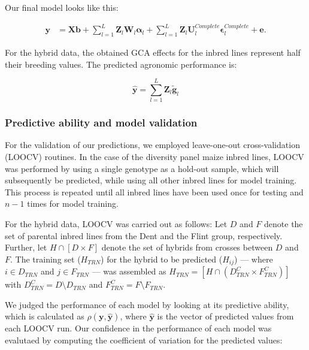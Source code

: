 \documentclass[]{elsarticle} %
\begin{document}
Our final model looks like this:

\begin{align}
 \label{eq:final-model}
\mathbf{y} &= \mathbf{Xb} +
\sum_{l=1}^{L} \mathbf{Z}_{l}\mathbf{W}_{l} \boldsymbol{\alpha}_{l} + 
\sum_{l=1}^{L} \mathbf{Z}_{l}\mathbf{U}_{l}^{Complete} \boldsymbol{\epsilon}_{l}^{Complete} +
\mathbf{e}.
\end{align}

For the hybrid data, the obtained GCA effects for the inbred lines
represent half their breeding values. The predicted agronomic
performance is:

\begin{equation}
 \label{eq:predicted-performance}
\hat{\mathbf{y}} = \sum_{l=1}^{L} \mathbf{Z}_{l}\tilde{\mathbf{g}}_{l} 
\end{equation}

\subsubsection{Predictive ability and model
validation}\label{predictive-ability-and-model-validation}

For the validation of our predictions, we employed leave-one-out
cross-validation (LOOCV) routines. In the case of the diversity panel
maize inbred lines, LOOCV was performed by using a single genotype as a
hold-out sample, which will subsequently be predicted, while using all
other inbred lines for model training. This process is repeated until
all inbred lines have been used once for testing and \(n - 1\) times for
model training.

For the hybrid data, LOOCV was carried out as follows: Let \(D\) and
\(F\) denote the set of parental inbred lines from the Dent and the
Flint group, respectively. Further, let \(H \cap [D \times F]\) denote
the set of hybrids from crosses between \(D\) and \(F\). The training
set (\(H_{TRN}\)) for the hybrid to be predicted (\(H_{ij}\)) --- where
\(i \in D_{TRN}\) and \(j \in F_{TRN}\) --- was assembled as
\(H_{TRN} = [H \cap (D_{TRN}^{C} \times F_{TRN}^{C})]\) with
\(D_{TRN}^{C} = D \setminus D_{TRN}\) and
\(F_{TRN}^{C} = F \setminus F_{TRN}\).

We judged the performance of each model by looking at its predictive
ability, which is calculated as \(\rho(\mathbf{y}, \mathbf{\hat{y}})\),
where \(\mathbf{\hat{y}}\) is the vector of predicted values from each
LOOCV run. Our confidence in the performance of each model was evalutaed
by computing the coefficient of variation for the predicted values:
\end{document}
